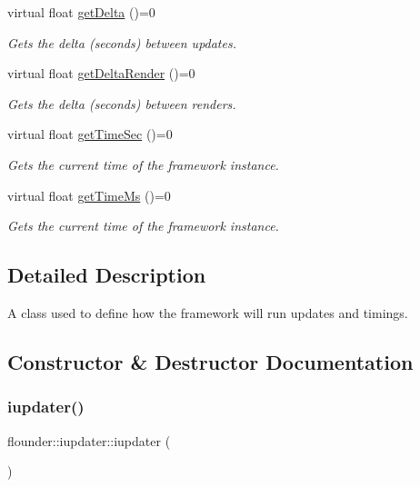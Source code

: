 \begin{DoxyCompactItemize}
virtual float \hyperlink{classflounder_1_1iupdater_a1a3813366f3a4f08cb91e23cd7b63cda}{get\+Delta} ()=0
\begin{DoxyCompactList}\small\item\em Gets the delta (seconds) between updates. \end{DoxyCompactList}\item 
virtual float \hyperlink{classflounder_1_1iupdater_a242d2c4bef63ac11560ac4f13dd4ad3f}{get\+Delta\+Render} ()=0
\begin{DoxyCompactList}\small\item\em Gets the delta (seconds) between renders. \end{DoxyCompactList}\item 
virtual float \hyperlink{classflounder_1_1iupdater_aab92d5e84c55e35d1b8a9a4f5628e3b4}{get\+Time\+Sec} ()=0
\begin{DoxyCompactList}\small\item\em Gets the current time of the framework instance. \end{DoxyCompactList}\item 
virtual float \hyperlink{classflounder_1_1iupdater_a6f5a67e27507165d4423b32e29ca3446}{get\+Time\+Ms} ()=0
\begin{DoxyCompactList}\small\item\em Gets the current time of the framework instance. \end{DoxyCompactList}\end{DoxyCompactItemize}


\subsection{Detailed Description}
A class used to define how the framework will run updates and timings. 



\subsection{Constructor \& Destructor Documentation}
\mbox{\label{classflounder_1_1iupdater_acbbc1766a8c236ba89ff55eee9b25850}} 
\subsubsection{\texorpdfstring{iupdater()}{iupdater()}}
{\footnotesize\ttfamily flounder\+::iupdater\+::iupdater (\begin{DoxyParamCaption}{ }\end{DoxyParamCaption})\hspace{0.3cm}{\ttfamily [inline]}}



